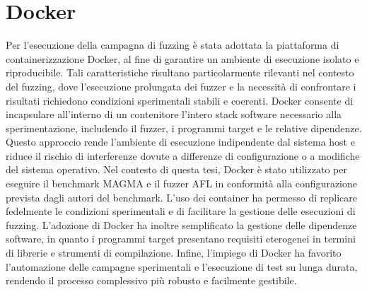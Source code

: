 \section{Docker}
Per l’esecuzione della campagna di fuzzing è stata adottata la piattaforma di containerizzazione Docker, al fine di garantire un ambiente di esecuzione isolato e riproducibile. Tali caratteristiche risultano particolarmente rilevanti nel contesto del fuzzing, dove l’esecuzione prolungata dei fuzzer e la necessità di confrontare i risultati richiedono condizioni sperimentali stabili e coerenti.
Docker consente di incapsulare all’interno di un contenitore l’intero stack software necessario alla sperimentazione, includendo il fuzzer, i programmi target e le relative dipendenze. Questo approccio rende l’ambiente di esecuzione indipendente dal sistema host e riduce il rischio di interferenze dovute a differenze di configurazione o a modifiche del sistema operativo.
Nel contesto di questa tesi, Docker è stato utilizzato per eseguire il benchmark MAGMA e il fuzzer AFL in conformità alla configurazione prevista dagli autori del benchmark. L’uso dei container ha permesso di replicare fedelmente le condizioni sperimentali e di facilitare la gestione delle esecuzioni di fuzzing.
L’adozione di Docker ha inoltre semplificato la gestione delle dipendenze software, in quanto i programmi target presentano requisiti eterogenei in termini di librerie e strumenti di compilazione.
Infine, l’impiego di Docker ha favorito l’automazione delle campagne sperimentali e l’esecuzione di test su lunga durata, rendendo il processo complessivo più robusto e facilmente gestibile.




